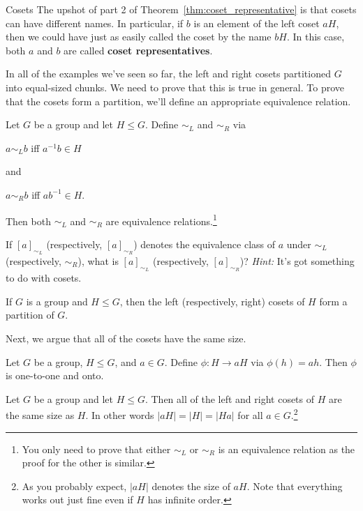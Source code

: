 \begin{section}{Cosets}
The upshot of part 2 of Theorem~\ref{thm:coset_representative} is that cosets can have different names.  In particular, if $b$ is an element of the left coset $aH$, then we could have just as easily called the coset by the name $bH$.  In this case, both $a$ and $b$ are called \textbf{coset representatives}.

In all of the examples we've seen so far, the left and right cosets partitioned $G$ into equal-sized chunks.  We need to prove that this is true in general.  To prove that the cosets form a partition, we'll define an appropriate equivalence relation.

\begin{theorem}
Let $G$ be a group and let $H\leq G$.  Define $\sim_L$ and $\sim_R$ via 
\begin{center}
$a\sim_L b$ iff $a^{-1}b\in H$
\end{center}
and
\begin{center}
$a\sim_R b$ iff $ab^{-1}\in H$.
\end{center}
Then both $\sim_L$ and $\sim_R$ are equivalence relations.\footnote{You only need to prove that either $\sim_L$ or $\sim_R$ is an equivalence relation as the proof for the other is similar.}
\end{theorem}

\begin{problem}
If $[a]_{\sim_L}$ (respectively, $[a]_{\sim_R}$) denotes the equivalence class of $a$ under $\sim_L$ (respectively, $\sim_R$), what is $[a]_{\sim_L}$ (respectively, $[a]_{\sim_R}$)?  \emph{Hint:} It's got something to do with cosets.
\end{problem}

\begin{corollary}
If $G$ is a group and $H\leq G$, then the left (respectively, right) cosets of $H$ form a partition of $G$.
\end{corollary}

Next, we argue that all of the cosets have the same size.

\begin{theorem}
Let $G$ be a group, $H\leq G$, and $a\in G$.  Define $\phi:H\to aH$ via $\phi(h)=ah$.  Then $\phi$ is one-to-one and onto.
\end{theorem}

\begin{corollary}\label{cor:cosets_same_size}
Let $G$ be a group and let $H\leq G$.  Then all of the left and right cosets of $H$ are the same size as $H$.  In other words $|aH|=|H|=|Ha|$ for all $a\in G$.\footnote{As you probably expect, $|aH|$ denotes the size of $aH$. Note that everything works out just fine even if $H$ has infinite order.}
\end{corollary}

\end{section}

